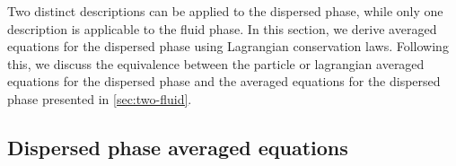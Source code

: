 Two distinct descriptions can be applied to the dispersed phase, while only one description is applicable to the fluid phase. 
In this section, we derive averaged equations for the dispersed phase using Lagrangian conservation laws. 
Following this, we  discuss the equivalence between the particle or lagrangian averaged equations for the dispersed phase and the averaged equations for the dispersed phase presented in \ref{sec:two-fluid}.



\subsection{Dispersed phase averaged equations}

